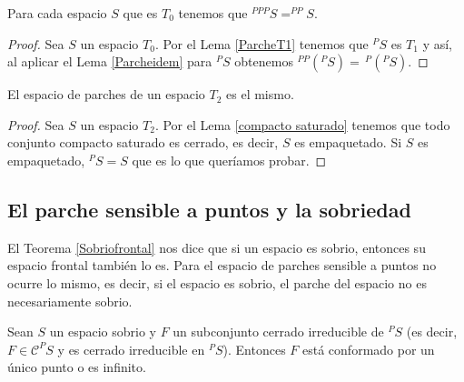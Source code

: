 \begin{cor}
    Para cada espacio $S$ que es $T_0$ tenemos que $^{PPP}S=^{PP}S$.
\end{cor}

\begin{proof}
    Sea $S$ un espacio $T_0$. Por el Lema \ref{ParcheT1} tenemos que $^PS$ es $T_1$ y así, al aplicar el Lema \ref{Parcheidem} para $^PS$ obtenemos $^{PP}(^PS)=\,^P(^PS)$.
\end{proof}

\begin{lem}\label{ParcheT2}
    El espacio de parches de un espacio $T_2$ es el mismo.
\end{lem}

\begin{proof}
    Sea $S$ un espacio $T_2$. Por el Lema \ref{compacto saturado} tenemos que todo conjunto compacto saturado es cerrado, es decir, $S$ es empaquetado. Si $S$ es empaquetado, $^PS=S$ que es lo que queríamos probar.
\end{proof}

\subsection{El parche sensible a puntos y la sobriedad}

El Teorema \ref{Sobriofrontal} nos dice que si un espacio es sobrio, entonces su espacio frontal también lo es. Para el espacio de parches sensible a puntos no ocurre lo mismo, es decir, si el espacio es sobrio, el parche del espacio no es necesariamente sobrio.

\begin{lem}\label{Lem4.3.1}
    Sean $S$ un espacio sobrio y $F$ un subconjunto cerrado irreducible de $^PS$ (es decir, $F\in \mathcal{C}^PS$ y es cerrado irreducible en  $^PS$). Entonces $F$ está conformado por un único punto o es infinito.
\end{lem}

